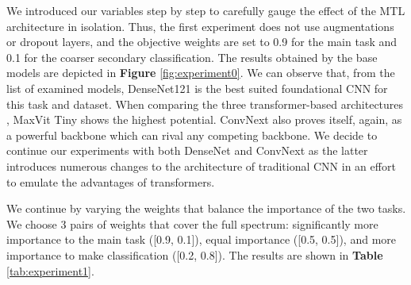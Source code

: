 \documentclass[conference]{IEEEtran}
\begin{document}

We introduced our variables step by step to carefully gauge the effect of the MTL architecture in isolation. Thus, the first experiment does not use augmentations or dropout layers, and the objective weights are set to 0.9 for the main task and 0.1 for the coarser secondary classification. The results obtained by the base models are depicted in \textbf{Figure} \ref{fig:experiment0}. We can observe that, from the list of examined models, DenseNet121 is the best suited foundational CNN for this task and dataset. When comparing the three transformer-based architectures \cite{vaswani2017attention}, MaxVit Tiny shows the highest potential. ConvNext also proves itself, again, as a powerful backbone which can rival any competing backbone. We decide to continue our experiments with both DenseNet and ConvNext as the latter introduces numerous changes to the architecture of traditional CNN in an effort to emulate the advantages of transformers. 

We continue by varying the weights that balance the importance of the two tasks. We choose 3 pairs of weights that cover the full spectrum: significantly more importance to the main task ([0.9, 0.1]), equal importance ([0.5, 0.5]), and more importance to make classification ([0.2, 0.8]). The results are shown in \textbf{Table } \ref{tab:experiment1}.

\end{document}

